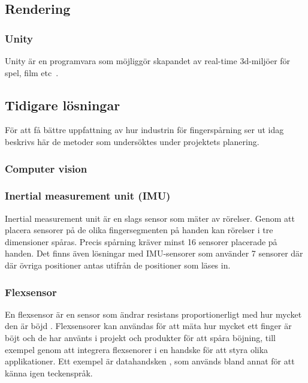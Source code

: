 \documentclass[a4paper]{article}
\begin{document}
\begin{sloppypar}
  \subsection{Rendering}
  \subsubsection{Unity}
  Unity är en programvara som möjliggör skapandet av real-time 3d-miljöer för spel, film etc~\cite{site:Unity}.

  \subsection{Tidigare lösningar}
  För att få bättre uppfattning av hur industrin för fingerspårning ser ut idag beskrivs här de metoder som undersöktes under projektets planering.
  \subsubsection{Computer vision}

  \subsubsection{Inertial measurement unit (IMU)}
  Inertial measurement unit är en slags sensor som mäter av rörelser. Genom att
  placera sensorer på de olika fingersegmenten på handen kan rörelser i tre
  dimensioner spåras. Precis spårning kräver minst 16 sensorer placerade på
  handen. Det finns även lösningar med IMU-sensorer som använder 7 sensorer
  där där övriga positioner antas utifrån de positioner som läses in.\cite{wiki:Finger_tracking}

  \subsubsection{Flexsensor}
  En flexsensor är en sensor som ändrar resistans proportionerligt med hur mycket den är böjd \cite{wiki:Flex_sensor}.
  Flexsensorer kan användas för att mäta hur mycket ett finger är böjt och de har använts i projekt och produkter för att spåra böjning, till exempel genom att integrera flexsenorer i en handske för att styra olika applikationer. Ett exempel är datahandsken \cite{wiki:Wired_glove}, som används bland annat för att känna igen teckenspråk.


\end{sloppypar}
\end{document}
